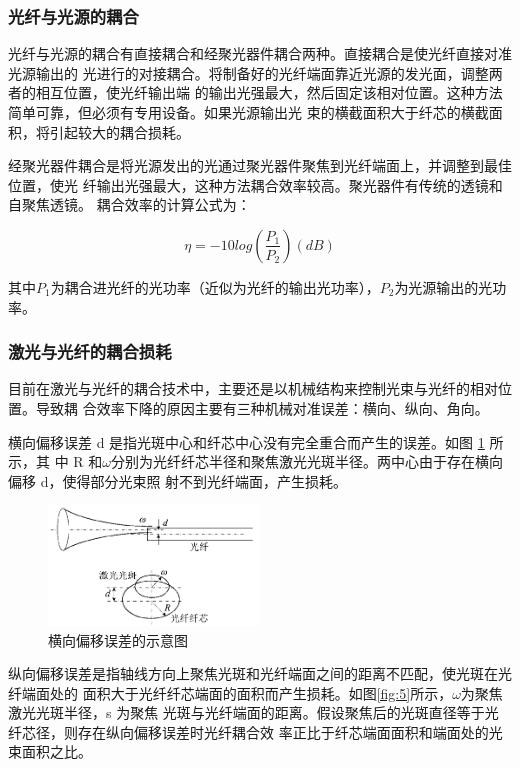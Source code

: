 \documentclass[10pt,a4paper,twoside,UTF8]{ctexart}
\begin{document}
\subsubsection{光纤与光源的耦合}
光纤与光源的耦合有直接耦合和经聚光器件耦合两种。直接耦合是使光纤直接对准光源输出的
光进行的对接耦合。将制备好的光纤端面靠近光源的发光面，调整两者的相互位置，使光纤输出端
的输出光强最大，然后固定该相对位置。这种方法简单可靠，但必须有专用设备。如果光源输出光
束的横截面积大于纤芯的横截面积，将引起较大的耦合损耗。

经聚光器件耦合是将光源发出的光通过聚光器件聚焦到光纤端面上，并调整到最佳位置，使光
纤输出光强最大，这种方法耦合效率较高。聚光器件有传统的透镜和自聚焦透镜。
耦合效率的计算公式为：

\begin{equation}
	\eta=-10log \left(\frac{P_1}{P_2}\right) (dB)
\end{equation}

其中$P_1$为耦合进光纤的光功率（近似为光纤的输出光功率），$P_2$为光源输出的光功率。

\subsubsection{激光与光纤的耦合损耗}
目前在激光与光纤的耦合技术中，主要还是以机械结构来控制光束与光纤的相对位置。导致耦
合效率下降的原因主要有三种机械对准误差：横向、纵向、角向。

横向偏移误差 d 是指光斑中心和纤芯中心没有完全重合而产生的误差。如图 \ref{fig:4} 所示，其
中 R 和$\omega$分别为光纤纤芯半径和聚焦激光光斑半径。两中心由于存在横向偏移 d，使得部分光束照
射不到光纤端面，产生损耗。

\begin{figure}[H]
	\centering
	\includegraphics[width=0.5\textwidth]{img//4.png}
	\caption{横向偏移误差的示意图}
	\label{fig:4}
\end{figure}

纵向偏移误差是指轴线方向上聚焦光斑和光纤端面之间的距离不匹配，使光斑在光纤端面处的
面积大于光纤纤芯端面的面积而产生损耗。如图\ref{fig:5}所示，$\omega$为聚焦激光光斑半径，s 为聚焦
光斑与光纤端面的距离。假设聚焦后的光斑直径等于光纤芯径，则存在纵向偏移误差时光纤耦合效
率正比于纤芯端面面积和端面处的光束面积之比。
\end{document}
